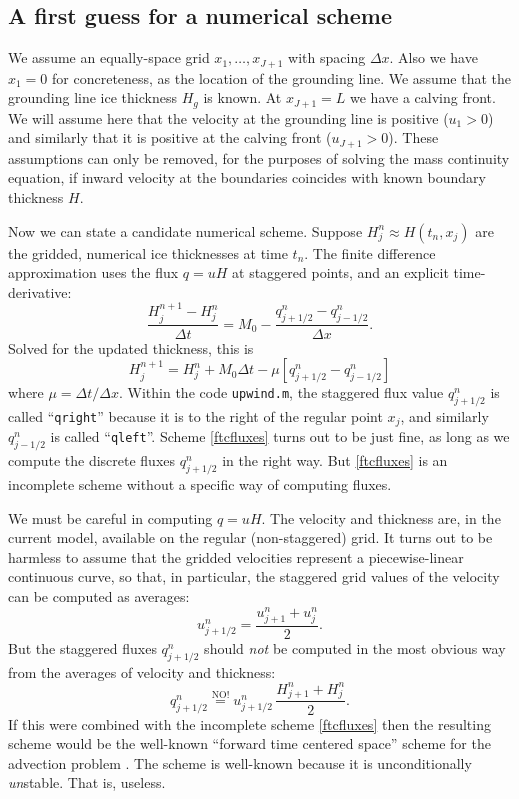 \documentclass[titlepage,a4paper,final,12pt]{scrartcl}
\begin{document}
\subsection*{A first guess for a numerical scheme}  We assume an equally-space grid $x_1,\dots,x_{J+1}$ with spacing $\Delta x$.  Also we have $x_1=0$ for concreteness, as the location of the grounding line.  We assume that the grounding line ice thickness $H_g$ is known.  At $x_{J+1} = L$ we have a calving front.  We will assume here that the velocity at the grounding line is positive ($u_1 > 0$) and similarly that it is positive at the calving front ($u_{J+1} > 0$).  These assumptions can only be removed, for the purposes of solving the mass continuity equation, if inward velocity at the boundaries coincides with known boundary thickness $H$.

Now we can state a candidate numerical scheme.  Suppose $H_j^n \approx H(t_n,x_j)$ are the gridded, numerical ice thicknesses at time $t_n$.  The finite difference approximation uses the flux $q = u H$ at staggered points, and an explicit time-derivative:
	$$\frac{H_j^{n+1} - H_j^n}{\Delta t} = M_0 - \frac{q_{j+1/2}^n - q_{j-1/2}^n}{\Delta x}.$$
Solved for the updated thickness, this is
\begin{equation}
H_j^{n+1} = H_j^n + M_0 \Delta t - \mu \left[q_{j+1/2}^n - q_{j-1/2}^n\right]  \label{ftcfluxes}
\end{equation}
where $\mu = \Delta t / \Delta x$.  Within the code \texttt{upwind.m}, the staggered flux value $q_{j+1/2}^n$ is called ``\texttt{qright}'' because it is to the right of the regular point $x_j$, and similarly $q_{j-1/2}^n$ is called ``\texttt{qleft}''.  Scheme \eqref{ftcfluxes} turns out to be just fine, as long as we compute the discrete fluxes $q_{j+1/2}^n$ in the right way.  But \eqref{ftcfluxes} is an incomplete scheme without a specific way of computing fluxes.

We must be careful in computing $q = u H$.  The velocity and thickness are, in the current model, available on the regular (non-staggered) grid.  It turns out to be harmless to assume that the gridded velocities represent a piecewise-linear continuous curve, so that, in particular, the staggered grid values of the velocity can be computed as averages:
\begin{equation}
  u_{j+1/2}^n = \frac{u_{j+1}^n + u_j^n}{2}. \label{ustag}
\end{equation}
But the staggered fluxes $q_{j+1/2}^n$ should \emph{not} be computed in the most obvious way from the averages of velocity and thickness:
	$$q_{j+1/2}^n \stackrel{\text{NO!}}{=} u_{j+1/2}^n\,\frac{H_{j+1}^n + H_j^n}{2}.$$
If this were combined with the incomplete scheme \eqref{ftcfluxes} then the resulting scheme would be the well-known ``forward time centered space'' scheme for the advection problem \cite{MortonMayers}.  The scheme is well-known because it is unconditionally \emph{un}stable.  That is, useless.
\end{document}
